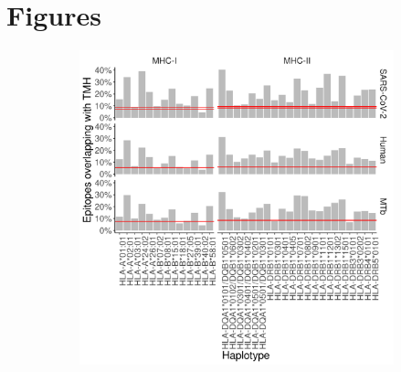 \newpage
\section{Figures}

\newpage

\thispagestyle{empty}

%
%
\begin{figure}[!htbp]
  \centering
  \begin{subfigure}[t]{0.8\textwidth}
    \centering
    \caption{}
    \includegraphics[width=\linewidth]{bbbq_1_smart_results/fig_f_tmh_2_panel.png}
    \label{fig:bbbq_1_smart_results}
  \end{subfigure}

  \vfill


\end{figure}
